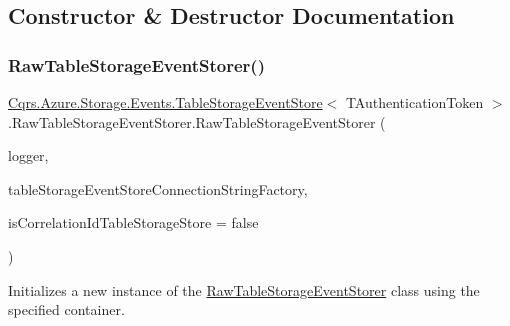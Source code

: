 \subsection{Constructor \& Destructor Documentation}
\mbox{\label{classCqrs_1_1Azure_1_1Storage_1_1Events_1_1TableStorageEventStore_1_1RawTableStorageEventStorer_af5ed87f6a4d32ff3581a6d2ae107dcd1_af5ed87f6a4d32ff3581a6d2ae107dcd1}} 
\subsubsection{\texorpdfstring{Raw\+Table\+Storage\+Event\+Storer()}{RawTableStorageEventStorer()}}
{\footnotesize\ttfamily \hyperlink{classCqrs_1_1Azure_1_1Storage_1_1Events_1_1TableStorageEventStore}{Cqrs.\+Azure.\+Storage.\+Events.\+Table\+Storage\+Event\+Store}$<$ T\+Authentication\+Token $>$.Raw\+Table\+Storage\+Event\+Storer.\+Raw\+Table\+Storage\+Event\+Storer (\begin{DoxyParamCaption}\item[{I\+Logger}]{logger,  }\item[{\hyperlink{interfaceCqrs_1_1Azure_1_1BlobStorage_1_1ITableStorageStoreConnectionStringFactory}{I\+Table\+Storage\+Store\+Connection\+String\+Factory}}]{table\+Storage\+Event\+Store\+Connection\+String\+Factory,  }\item[{bool}]{is\+Correlation\+Id\+Table\+Storage\+Store = {\ttfamily false} }\end{DoxyParamCaption})}



Initializes a new instance of the \hyperlink{classCqrs_1_1Azure_1_1Storage_1_1Events_1_1TableStorageEventStore_1_1RawTableStorageEventStorer}{Raw\+Table\+Storage\+Event\+Storer} class using the specified container. 



